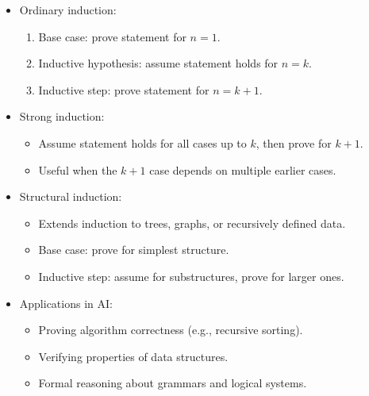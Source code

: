 \documentclass[
  letterpaper,
  DIV=11,
  numbers=noendperiod]{scrreprt}
\providecommand{\tightlist}{%
  \setlength{\itemsep}{0pt}\setlength{\parskip}{0pt}}
\begin{document}
\begin{itemize}
\item
  Ordinary induction:

  \begin{enumerate}
  \def\labelenumi{\arabic{enumi}.}
  \tightlist
  \item
    Base case: prove statement for \(n=1\).
  \item
    Inductive hypothesis: assume statement holds for \(n=k\).
  \item
    Inductive step: prove statement for \(n=k+1\).
  \end{enumerate}
\item
  Strong induction:

  \begin{itemize}
  \tightlist
  \item
    Assume statement holds for all cases up to \(k\), then prove for
    \(k+1\).
  \item
    Useful when the \(k+1\) case depends on multiple earlier cases.
  \end{itemize}
\item
  Structural induction:

  \begin{itemize}
  \tightlist
  \item
    Extends induction to trees, graphs, or recursively defined data.
  \item
    Base case: prove for simplest structure.
  \item
    Inductive step: assume for substructures, prove for larger ones.
  \end{itemize}
\item
  Applications in AI:

  \begin{itemize}
  \tightlist
  \item
    Proving algorithm correctness (e.g., recursive sorting).
  \item
    Verifying properties of data structures.
  \item
    Formal reasoning about grammars and logical systems.
  \end{itemize}
\end{itemize}
\end{document}

